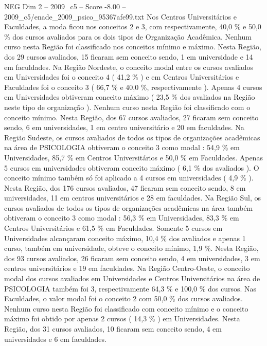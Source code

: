 \begin{textsample}{NEG Dim 2 – 2009\_c5 – Score -8.00 – 2009\_c5/enade\_2009\_psico\_95367afe99.txt}
Nos Centros Universitários e Faculdades, a moda ficou nos conceitos 2 e 3, com respectivamente, 40,0 \% e 50,0 \% dos cursos avaliados para os dois tipos de Organização Acadêmica.
Nenhum curso nesta Região foi classificado nos conceitos mínimo e máximo.
Nesta Região, dos 29 cursos avaliados, 15 ficaram sem conceito sendo, 1 em universidade e 14 em faculdades.
Na Região Nordeste, o conceito modal entre os cursos avaliados em Universidades foi o conceito 4 ( 41,2 \% ) e em Centros Universitários e Faculdades foi o conceito 3 ( 66,7 \% e 40,0 \%, respectivamente ).
Apenas 4 cursos em Universidades obtiveram conceito máximo ( 23,5 \% dos avaliados na Região neste tipo de organização ).
Nenhum curso nesta Região foi classificado com o conceito mínimo.
Nesta Região, dos 67 cursos avaliados, 27 ficaram sem conceito sendo, 6 em universidades, 1 em centro universitário e 20 em faculdades.
Na Região Sudeste, os cursos avaliados de todos os tipos de organizações acadêmicas na área de PSICOLOGIA obtiveram o conceito 3 como modal : 54,9 \% em Universidades, 85,7 \% em Centros Universitários e 50,0 \% em Faculdades.
Apenas 5 cursos em universidades obtiveram conceito máximo ( 6,1 \% dos avaliados ).
O conceito mínimo também só foi aplicado a 4 cursos em universidades ( 4,9 \% ).
Nesta Região, dos 176 cursos avaliados, 47 ficaram sem conceito sendo, 8 em universidades, 11 em centros universitários e 28 em faculdades.
Na Região Sul, os cursos avaliados de todos os tipos de organizações acadêmicas na área também obtiveram o conceito 3 como modal : 56,3 \% em Universidades, 83,3 \% em Centros Universitários e 61,5 \% em Faculdades.
Somente 5 cursos em Universidades alcançaram conceito máximo, 10,4 \% dos avaliados e apenas 1 curso, também em universidade, obteve o conceito mínimo, 1,9 \%.
Nesta Região, dos 93 cursos avaliados, 26 ficaram sem conceito sendo, 4 em universidades, 3 em centros universitários e 19 em faculdades.
Na Região Centro-Oeste, o conceito modal dos cursos avaliados em Universidades e Centros Universitários na área de PSICOLOGIA também foi 3, respectivamente 64,3 \% e 100,0 \% dos cursos.
Nas Faculdades, o valor modal foi o conceito 2 com 50,0 \% dos cursos avaliados.
Nenhum curso nesta Região foi classificado com conceito mínimo e o conceito máximo foi obtido por apenas 2 cursos ( 14,3 \% ) em Universidades.
Nesta Região, dos 31 cursos avaliados, 10 ficaram sem conceito sendo, 4 em universidades e 6 em faculdades.

\end{textsample}
